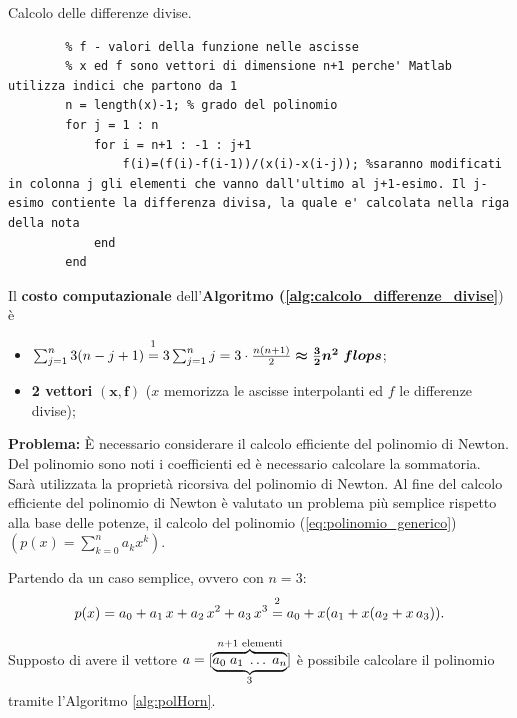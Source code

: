 \begin{algorithm}
\caption{Calcolo delle differenze divise.}\label{alg:calcolo_differenze_divise}
    \begin{lstlisting}[style=Matlab-editor]
        % x - ascisse di interpolazione
        % f - valori della funzione nelle ascisse
        % x ed f sono vettori di dimensione n+1 perche' Matlab utilizza indici che partono da 1
        n = length(x)-1; % grado del polinomio
        for j = 1 : n
            for i = n+1 : -1 : j+1
                f(i)=(f(i)-f(i-1))/(x(i)-x(i-j)); %saranno modificati in colonna j gli elementi che vanno dall'ultimo al j+1-esimo. Il j-esimo contiente la differenza divisa, la quale e' calcolata nella riga della nota
            end
        end
    \end{lstlisting}
\end{algorithm}

\begin{remark} Il \textbf{costo computazionale} dell'\textbf{Algoritmo (\ref{alg:calcolo_differenze_divise}}) è
    \begin{itemize}
        \item $\sum_{j=1}^{n}3(n-j+1)\overset{\footnotemark}{=} 3\sum_{j=1}^{n}j=3\cdot\frac{n(n+1)}{2}\boldsymbol{\approx \frac{3}{2}n^2\; flops}$; 
        \item \textbf{2 vettori} $\boldsymbol{(x, f)}$ ($x$ memorizza le ascisse interpolanti ed $f$ le differenze divise);
    \end{itemize}
\end{remark}

\noindent\textbf{Problema:} È necessario considerare il calcolo efficiente del polinomio di Newton. Del polinomio sono noti i coefficienti ed è necessario calcolare la sommatoria. Sarà utilizzata la proprietà ricorsiva del polinomio di Newton. Al fine del calcolo efficiente del polinomio di Newton è valutato un problema più semplice rispetto alla base delle potenze, il calcolo del polinomio (\ref{eq:polinomio_generico})  $\left(p(x)=\sum_{k=0}^{n}a_kx^k\right)$.

Partendo da un caso semplice, ovvero con $n=3$:
\begin{equation*}
    p(x)=a_0+a_1\,x+a_2\,x^2+a_3\,x^3\overset{\footnotemark}{=} a_0+ x(a_1+x(a_2+x\,a_3)).
\end{equation*}

Supposto di avere il vettore $a=[\underbrace{\overbrace{a_0\; a_1\; \hdots\; a_n}^{n+1\text{ elementi}}}_{\footnotemark}]$  è possibile calcolare il polinomio tramite l'Algoritmo \ref{alg:polHorn}.

